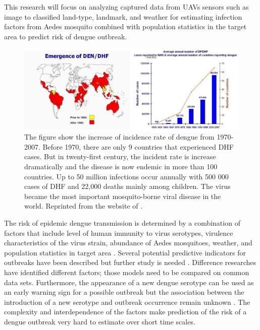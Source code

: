 \documentclass[review]{elsarticle}
\begin{document}
This research will focus on analyzing captured data from UAVs sensors such as image to classified land-type, landmark, and weather for estimating infection factors from Aedes mosquito combined with population statistics in the target area to predict risk of dengue outbreak.
	\begin{figure}[htbp]
		\begin{center}
			\includegraphics[width=150mm]{./figures/denguespread}
			\caption[Increase of dengue incidence rate from 1970-2007 in worldwide. Reprinted from the website of \protect\cite{whoimpactdengue2008}.]{The figure show the increase of incidence rate of dengue from 1970-2007. Before 1970, there are only 9 countries that experienced DHF cases. But in twenty-first century, the incident rate is increase dramatically and the disease is now endemic in more than 100 countries. Up to 50 million infections occur annually with 500 000 cases of DHF and 22,000 deaths mainly among children. The virus became the most important mosquito-borne viral disease in the world. Reprinted from the website of \protect\cite{whoimpactdengue2008}.}	
			\label{figure-denguespread}
		\end{center}
	\end{figure}

The risk of epidemic dengue transmission is determined by a combination of factors that include level of human immunity to virus serotypes, virulence characteristics of the virus strain, abundance of Aedes mosquitoes, weather, and population statistics in target area \cite{focks1995simulation}. Several potential predictive indicators for outbreaks have been described but further study is needed \cite{leitmeyer1999dengue,runge2008does,thammapalo2008environmental,sarfraz2014near}. Difference researches have identified different factors; those models need to be compared on common data sets. Furthermore, the appearance of a new dengue serotype can be used as an early warning sign for a possible outbreak but the association between the introduction of a new serotype and outbreak occurrence remain unknown \cite{de2004dengue}. The complexity and interdependence of the factors make prediction of the risk of a dengue outbreak very hard to estimate over short time scales. 
	
\end{document}
